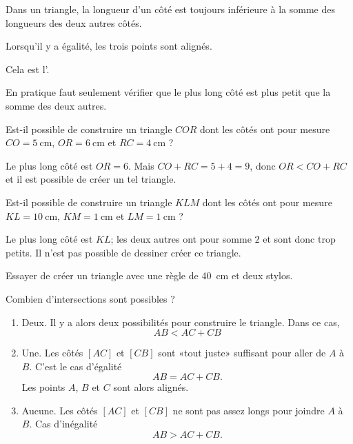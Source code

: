 \begin{Aretenir}
Dans un triangle, la longueur d'un côté est toujours inférieure à la somme des longueurs des deux autres côtés.

Lorsqu'il y a égalité, les trois points sont alignés.

Cela est l'.
\end{Aretenir}

En pratique faut seulement vérifier que le plus long côté est plus petit que la somme des deux autres.

\begin{example}
    Est-il possible de construire un triangle \( COR\) dont les côtés ont pour mesure \( CO=\SI{5}{\centi\meter}\), \( OR=\SI{6}{\centi\meter}\) et \( RC=\SI{4}{\centi\meter}\) ?

    Le plus long côté est \( OR=6\). Mais \( CO+RC=5+4=9\), donc \( OR<CO+RC\) et il est possible de créer un tel triangle.
\end{example}

\begin{example}
    Est-il possible de construire un triangle \( KLM\) dont les côtés ont pour mesure \( KL=\SI{10}{\centi\meter}\), \( KM=\SI{1}{\centi\meter}\) et \( LM=\SI{1}{\centi\meter}\) ?

    Le plus long côté est \( KL\); les deux autres ont pour somme \( 2\) et sont donc trop petits. Il n'est pas possible de dessiner créer ce triangle.

\begin{center}
   
\end{center}

\end{example}

\begin{example}
    Essayer de créer un triangle avec une règle de \SI{40}{\centi\meter} et deux stylos.
\end{example}

Combien d'intersections sont possibles ?
\begin{enumerate}
    \item
        Deux. Il y a alors deux possibilités pour construire le triangle. Dans ce cas,
        \begin{equation}
            AB<AC+CB
        \end{equation}
    \item
        Une. Les côtés \( [AC]\) et \( [CB]\) sont «tout juste» suffisant pour aller de \( A\) à \( B\). C'est le cas d'égalité
        \begin{equation}
            AB=AC+CB.
        \end{equation}
        Les points \( A\), \( B\) et \( C\) sont alors alignés.
    \item 
        Aucune. Les côtés \( [AC]\) et \( [CB]\) ne sont pas assez longs pour joindre \( A\) à \( B\). Cas d'inégalité
        \begin{equation}
            AB>AC+CB.
        \end{equation}
\end{enumerate}

